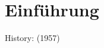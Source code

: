 \setcounter{page}{1} 
\setcounter{chapter}{-1}
\chapter{Einführung}

History: \cite{whitney} (1957)
